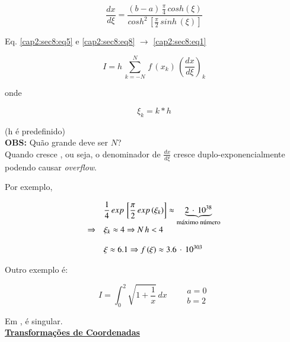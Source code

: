 \begin{equation}
 \label{cap2:sec8:eq8}
 \frac{dx}{d\xi} = \frac{(b-a) \, \displaystyle \frac{\pi}{4} \, cosh(\xi)}{cosh^2 \, \left[ \displaystyle \frac{\pi}{2} \, sinh\,(\xi) \right]}
\end{equation}

Eq. \ref{cap2:sec8:eq5} e \ref{cap2:sec8:eq8} $\rightarrow$ \ref{cap2:sec8:eq1}

\begin{equation}
 \label{cap2:sec8:eq9}
 I = h \, \sum_{k=-N}^N \, f\,(x_k) \, \left( \frac{dx}{d\xi} \right)_k
\end{equation}

onde

\[\xi_{k} = k \ast h\]

(h é predefinido)\\

\textbf{OBS:} Quão grande deve ser $N$?\\

Quando  cresce , ou seja, o denominador de $ \displaystyle \frac{dx}{d\xi}$ cresce duplo-exponencialmente podendo causar \textit{overflow}.

Por exemplo,

\[
 \begin{array}{ll}
  & \displaystyle \frac{1}{4} \, exp\,\left[ \frac{\pi}{2} \, exp\,(\xi_k) \right] \approx \underbrace{2 \, \cdot \, 10^{38}}_{\footnotesize{\mbox{máximo número}}} \\
  \Rightarrow & \xi_k \approx 4 \Rightarrow N\,h < 4 \\
  & \\
  & \xi \approx 6.1 \Rightarrow f\,(\xi) \approx 3.6 \, \cdot \, 10^{303}
 \end{array}
\]

Outro exemplo é:

\[
  I = \int_0^2 \sqrt{1 + \frac{1}{x}} \, dx \qquad
 \begin{array}{l}
  a = 0 \\
  b = 2
 \end{array}
\]

Em ,  é singular.\\

\underline{\textbf{Transformações de Coordenadas}}

